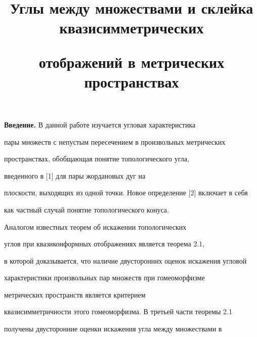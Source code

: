 

\title{Углы между множествами и склейка квазисимметрических


отображений в метрических пространствах}





\date{}




\pagestyle{plain} %







\maketitle


\label{begin}





\setcounter{section}{1}


\setcounter{equation}{0}





{\bf Введение.} В данной работе изучается угловая характеристика 


пары множеств с непустым пересечением в произвольных метрических 


пространствах, обобщающая понятие топологического угла, 


введенного в [1] для пары жордановых дуг на 


плоскости, выходящих из одной точки. Новое определение [2] включает в себя


как частный случай понятие топологического конуса.


Аналогом известных теорем об искажении топологических 


углов при квазиконформных отображениях является теорема 2.1, 


в которой доказывается, что наличие двусторонних оценок искажения угловой 


характеристики произвольных пар множеств при гомеоморфизме 


метрических пространств является критерием 


квазисимметричности этого гомеоморфизма. В третьей части теоремы 2.1 


получены двусторонние оценки искажения угла между множествами в 


